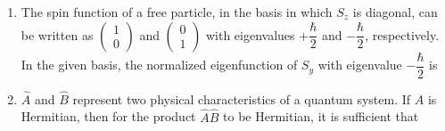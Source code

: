 \documentclass[14pt, a4paper]{extarticle}
\begin{document}
\begin{enumerate}[label=\textbf{Q. \arabic*}, start=21]
\item The spin function of a free particle, in the basis in which $S_z$ is diagonal, can be written as
$\begin{pmatrix} 1 \\ 0 \end{pmatrix}$ and $\begin{pmatrix} 0 \\ 1 \end{pmatrix}$ with eigenvalues $+\dfrac{\hbar}{2}$ and $-\dfrac{\hbar}{2}$, respectively. In the given basis, the normalized eigenfunction of $S_y$ with eigenvalue $-\dfrac{\hbar}{2}$ is
\begin{enumerate}
\end{enumerate}

\item $\hat{A}$ and $\hat{B}$ represent two physical characteristics of a quantum system. If $\hat{A}$ is Hermitian, then for the product $\hat{A}\hat{B}$ to be Hermitian, it is sufficient that
\begin{enumerate}
\end{enumerate}


\end{enumerate}
\end{document}
